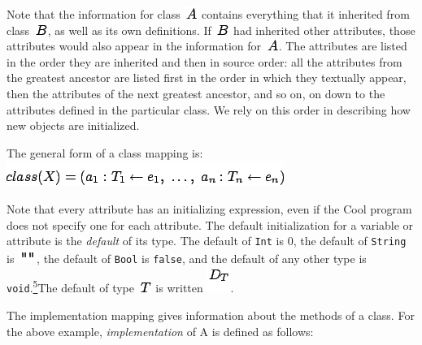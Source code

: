 \documentclass[]{article}
\begin{document}
Note that the information for class \includegraphics{img45.png} contains
everything that it inherited from class \includegraphics{img146.png}, as
well as its own definitions. If \includegraphics{img146.png} had
inherited other attributes, those attributes would also appear in the
information for \includegraphics{img45.png}. The attributes are listed
in the order they are inherited and then in source order: all the
attributes from the greatest ancestor are listed first in the order in
which they textually appear, then the attributes of the next greatest
ancestor, and so on, on down to the attributes defined in the particular
class. We rely on this order in describing how new objects are
initialized.

The general form of a class mapping is: \\

\includegraphics{img147.png}

Note that every attribute has an initializing expression, even if the
Cool program does not specify one for each attribute. The default
initialization for a variable or attribute is the \emph{default} of its
type. The default of \texttt{Int} is 0, the default of \texttt{String}
is \includegraphics{img148.png}, the default of \texttt{Bool} is
\texttt{false}, and the default of any other type is
\texttt{void}.\href{footnode.html\#foot1803}{\textsuperscript{5}}The
default of type \includegraphics{img58.png} is written
\includegraphics{img149.png}.

The implementation mapping gives information about the methods of a
class. For the above example, \emph{implementation} of A is defined as
follows:
\end{document}
